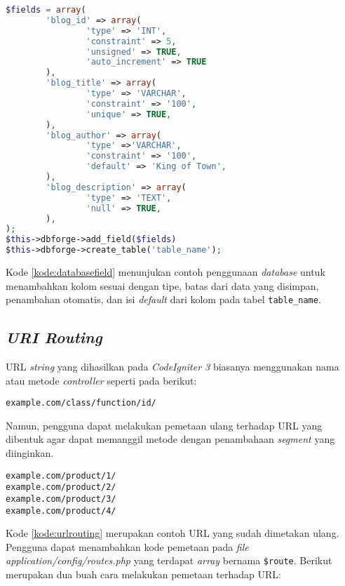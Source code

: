 \begin{lstlisting}[language=PHP, caption=Contoh menambahkan kolom dengan konfigurasinya menggunakan \textit{CodeIgniter3} , label=kode:databasefield]
	$fields = array(
        'blog_id' => array(
                'type' => 'INT',
                'constraint' => 5,
                'unsigned' => TRUE,
                'auto_increment' => TRUE
        ),
        'blog_title' => array(
                'type' => 'VARCHAR',
                'constraint' => '100',
                'unique' => TRUE,
        ),
        'blog_author' => array(
                'type' =>'VARCHAR',
                'constraint' => '100',
                'default' => 'King of Town',
        ),
        'blog_description' => array(
                'type' => 'TEXT',
                'null' => TRUE,
        ),
);
$this->dbforge->add_field($fields)
$this->dbforge->create_table('table_name');
\end{lstlisting}
Kode \ref{kode:databasefield} menunjukan contoh penggunaan \textit{database} untuk menambahkan kolom sesuai dengan tipe, batas dari data yang disimpan, penambahan otomatis, dan isi \textit{default} dari kolom pada tabel \texttt{table\_name}.

\subsection{\textit{URI Routing}}
URL \textit{string} yang dihasilkan pada \textit{CodeIgniter 3} biasanya menggunakan nama atau metode \textit{controller} seperti pada berikut:

\begin{center}
\verb|example.com/class/function/id/|
\end{center}

Namun, pengguna dapat melakukan pemetaan ulang terhadap URL yang dibentuk agar dapat memanggil metode dengan penambahaan \textit{segment} yang diinginkan.

\begin{lstlisting}[caption=Contoh URL yang sudah dimetakan,label=kode:urlrouting]
example.com/product/1/
example.com/product/2/
example.com/product/3/
example.com/product/4/
\end{lstlisting}

Kode \ref{kode:urlrouting} merupakan contoh URL yang sudah dimetakan ulang. Pengguna dapat menambahkan kode pemetaan pada \textit{file application/config/routes.php} yang terdapat \textit{array} bernama \verb|$route|. Berikut merupakan dua buah cara melakukan pemetaan terhadap URL:

